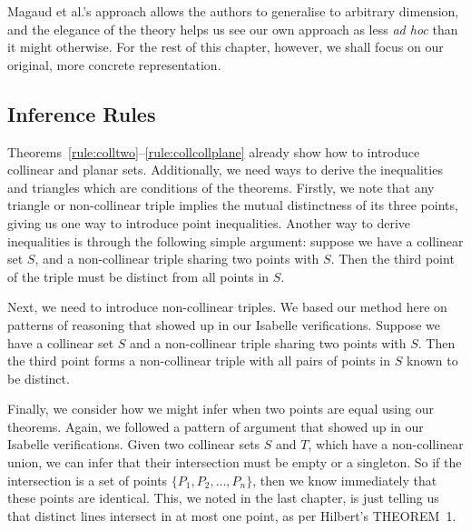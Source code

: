 Magaud et al.'s approach allows the authors to generalise to arbitrary dimension, and the elegance of the theory helps us see our own approach as less \emph{ad hoc} than it might otherwise. For the rest of this chapter, however, we shall focus on our original, more concrete representation.

\subsection{Inference Rules}\label{list:Procedures}
Theorems~\ref{rule:colltwo}--\ref{rule:collcollplane} already show how to introduce collinear and planar sets. Additionally, we need ways to derive the inequalities and triangles which are conditions of the theorems. Firstly, we note that any triangle or non-collinear triple implies the mutual distinctness of its three points, giving us one way to introduce point inequalities. Another way to derive inequalities is through the following simple argument: suppose we have a collinear set $S$, and a non-collinear triple sharing two points with $S$. Then the third point of the triple must be distinct from all points in $S$. 

Next, we need to introduce non-collinear triples. We based our method here on patterns of reasoning that showed up in our Isabelle verifications. Suppose we have a collinear set $S$ and a non-collinear triple sharing two points with $S$. Then the third point forms a non-collinear triple with all pairs of points in $S$ known to be distinct.

Finally, we consider how we might infer when two points are equal using our theorems. Again, we followed a pattern of argument that showed up in our Isabelle verifications. Given two collinear sets $S$ and $T$, which have a non-collinear union, we can infer that their intersection must be empty or a singleton. So if the intersection is a set of points $\{P_1,P_2,\ldots,P_n\}$, then we know immediately that these points are identical. This, we noted in the last chapter, is just telling us that distinct lines intersect in at most one point, as per Hilbert's THEOREM~1.

